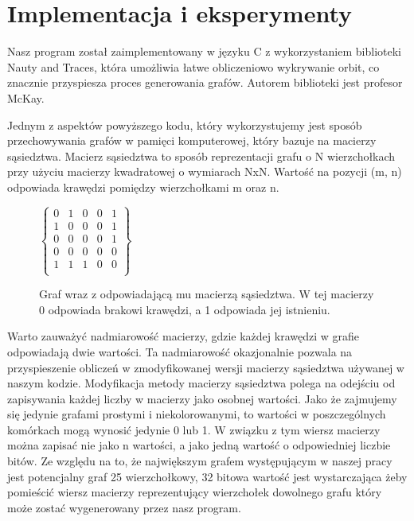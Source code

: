 \section{Implementacja i eksperymenty}
Nasz program został zaimplementowany w języku C z wykorzystaniem biblioteki Nauty and Traces\cite{nauty}, która umożliwia łatwe obliczeniowo wykrywanie orbit, co znacznie przyspiesza proces generowania grafów. 
Autorem biblioteki jest profesor McKay. 

Jednym z aspektów powyższego kodu, który wykorzystujemy jest sposób przechowywania grafów w pamięci komputerowej, który bazuje na macierzy sąsiedztwa. Macierz sąsiedztwa to sposób reprezentacji grafu o N wierzchołkach przy użyciu macierzy kwadratowej o wymiarach NxN. Wartość na pozycji (m, n) odpowiada  krawędzi pomiędzy wierzchołkami m oraz n.
\begin{figure}[h]
$\begin{Bmatrix}
	0 & 1 & 0 & 0 & 1 \\
	1 & 0 & 0 & 0 & 1 \\
	0 & 0 & 0 & 0 & 1 \\
	0 & 0 & 0 & 0 & 0 \\
	1 & 1 & 1 & 0 & 0 \\
	\end{Bmatrix}$

	\caption{Graf wraz z odpowiadającą mu macierzą sąsiedztwa. W tej macierzy 0 odpowiada brakowi krawędzi, a 1 odpowiada jej istnieniu.}
\end{figure}

Warto zauważyć nadmiarowość macierzy, gdzie każdej krawędzi w grafie odpowiadają dwie wartości. Ta nadmiarowość okazjonalnie pozwala na przyspieszenie obliczeń w zmodyfikowanej wersji macierzy sąsiedztwa używanej w naszym kodzie.
Modyfikacja metody macierzy sąsiedztwa polega na odejściu od zapisywania każdej liczby w macierzy jako osobnej wartości. Jako że zajmujemy się jedynie grafami prostymi i niekolorowanymi, to wartości w poszczególnych komórkach mogą wynosić jedynie 0 lub 1. W związku z tym wiersz macierzy można zapisać nie jako n wartości, a jako jedną wartość o odpowiedniej liczbie bitów. Ze względu na to, że największym grafem występującym w naszej pracy jest potencjalny graf 25 wierzchołkowy, 32 bitowa wartość jest wystarczająca żeby pomieścić wiersz macierzy reprezentujący wierzchołek dowolnego grafu który może zostać wygenerowany przez nasz program. 